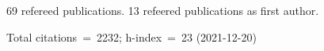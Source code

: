 69 refereed publications. 13 refeered publications as first author.

Total citations~=~2232; h-index~=~23 (2021-12-20)